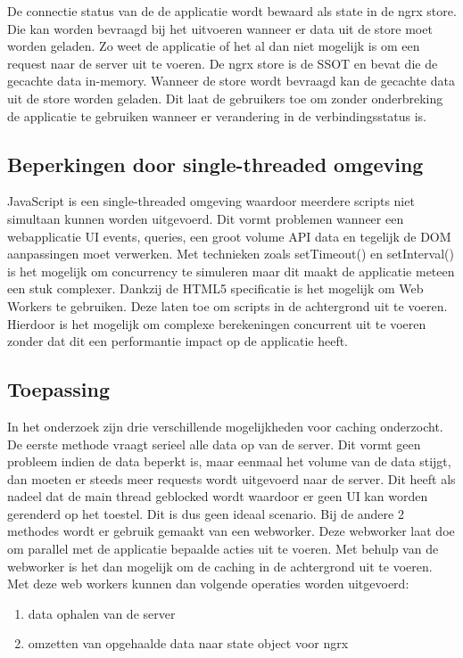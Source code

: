 De connectie status van de de applicatie wordt bewaard als state in de ngrx store. Die kan worden bevraagd bij het uitvoeren wanneer er data uit de store moet worden geladen. Zo weet de applicatie of het al dan niet mogelijk is om een request naar de server uit te voeren. De ngrx store is de SSOT en bevat die de gecachte data in-memory. Wanneer de store wordt bevraagd kan de gecachte data uit de store worden geladen. Dit laat de gebruikers toe om zonder onderbreking de applicatie te gebruiken wanneer er verandering in de verbindingsstatus is.

\subsection{Beperkingen door single-threaded omgeving}
JavaScript is een single-threaded omgeving waardoor meerdere scripts niet simultaan kunnen worden uitgevoerd. Dit vormt problemen wanneer een webapplicatie UI events, queries, een groot volume API data en tegelijk de DOM aanpassingen moet verwerken. Met technieken zoals setTimeout() en setInterval() is het mogelijk om concurrency te simuleren maar dit maakt de applicatie meteen een stuk complexer. Dankzij de HTML5 specificatie is het mogelijk om Web Workers te gebruiken. Deze laten toe om scripts in de achtergrond uit te voeren. Hierdoor is het mogelijk om complexe berekeningen concurrent uit te voeren zonder dat dit een performantie impact op de applicatie heeft.

\subsection{Toepassing}
In het onderzoek zijn drie verschillende mogelijkheden voor caching onderzocht. De eerste methode vraagt serieel alle data op van de server. Dit vormt geen probleem indien de data beperkt is, maar eenmaal het volume van de data stijgt, dan moeten er steeds meer requests wordt uitgevoerd naar de server. Dit heeft als nadeel dat de main thread geblocked wordt waardoor er geen UI kan worden gerenderd op het toestel. Dit is dus geen ideaal scenario. Bij de andere 2 methodes wordt er gebruik gemaakt van een webworker. Deze webworker laat doe om parallel met de applicatie bepaalde acties uit te voeren. Met behulp van de webworker is het dan mogelijk om de caching in de achtergrond uit te voeren. Met deze web workers kunnen dan volgende operaties worden uitgevoerd:

\begin{enumerate}
\item data ophalen van de server
\item omzetten van opgehaalde data naar state object voor ngrx
\end{enumerate}


